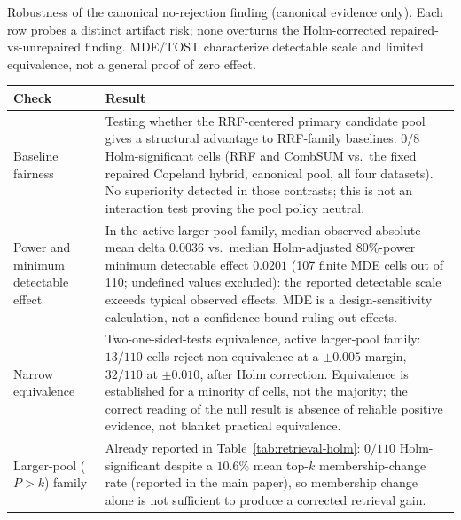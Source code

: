 \begin{supplementtable}
  \caption{Robustness of the canonical no-rejection finding (canonical evidence only).
    Each row probes a distinct artifact risk; none overturns the
    Holm-corrected repaired-vs-unrepaired finding. MDE/TOST characterize
    detectable scale and limited equivalence, not a general proof of
    zero effect.}
  \label{tab:robustness}
  \sncstable
  \begin{tabularx}{\linewidth}{@{}L{3.2cm}Y@{}}
    \toprule
    Check & Result \\
    \midrule
    Baseline fairness & Testing whether the RRF-centered primary candidate
      pool gives a structural advantage to RRF-family baselines: $0/8$
      Holm-significant cells (RRF and CombSUM vs.\ the fixed repaired
      Copeland hybrid, canonical pool, all four datasets). No superiority detected in those contrasts; this is not an interaction
      test proving the pool policy neutral. \\
    \addlinespace
    Power and minimum detectable effect & In the active larger-pool
      family, median observed absolute mean delta $0.0036$ vs.\ median
      Holm-adjusted 80\%-power minimum detectable effect $0.0201$
      (107 finite MDE cells out of 110; undefined values excluded): the
      reported detectable scale exceeds typical observed effects.
      MDE is a design-sensitivity calculation, not a confidence bound
      ruling out effects. \\
    \addlinespace
    Narrow equivalence & Two-one-sided-tests equivalence, active larger-pool
      family: $13/110$ cells reject non-equivalence at a $\pm 0.005$
      margin, $32/110$ at $\pm 0.010$, after Holm correction. Equivalence
      is established for a minority of cells, not the majority; the
      correct reading of the null result is absence of reliable positive
      evidence, not blanket practical equivalence. \\
    \addlinespace
    Larger-pool ($P{>}k$) family & Already reported in
      Table~\ref{tab:retrieval-holm}: $0/110$ Holm-significant despite a
      $10.6\%$ mean top-$k$ membership-change rate
      (reported in the main paper), so membership change
      alone is not sufficient to produce a corrected retrieval gain. \\
    \bottomrule
  \end{tabularx}
\end{supplementtable}